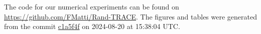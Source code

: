 The code for our numerical experiments can be found on \url{https://github.com/FMatti/Rand-TRACE}. The figures and tables were generated from the commit \href{https://github.com/FMatti/Rand-TRACE/tree/c1a5f4f}{c1a5f4f} on 2024-08-20 at 15:38:04 UTC.

